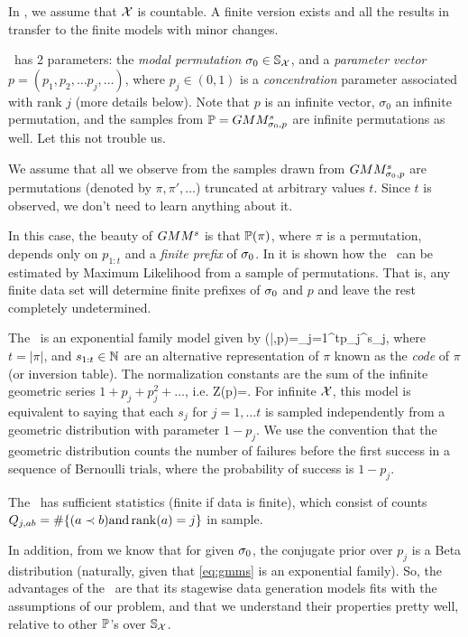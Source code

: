 \documentclass[10pt]{article}
\begin{document}
\benum
\item In \gmms, we assume that ${\mathcal X}$ is countable. A finite version exists and all the results in \cite{MBao} transfer to the finite models with minor changes.
\item \gmms~has 2 parameters: the {\em modal permutation} $\sigma_0\in
  {\mathbb S}_{{\mathcal X}}$, and a {\em parameter vector} 
  $p=(p_1,p_2,\ldots p_j,\ldots)$, where
  $p_j\in (0,1)$ is a {\em concentration} parameter associated
  with rank $j$ (more details below). Note that $p$ is an
  infinite vector, $\sigma_0$ an infinite permutation, and the samples
  from ${\mathbb P}=GMM^s_{\sigma_0,p}$ are infinite permutations as
  well. Let this not trouble us.
\item We assume that all we observe from the samples drawn from $GMM^s_{\sigma_0,p}$ are \topt permutations (denoted by $\pi,\pi',\ldots$) truncated at arbitrary values $t$. Since $t$ is observed, we don't need to learn anything about it.
\item
  In this case, the beauty of $GMM^s$ is that ${\mathbb P}(\pi)$, where $\pi$ is a \topt permutation, depends only on $p_{1:t}$ and a {\em finite prefix} of $\sigma_0$. In \cite{MBao} it is shown how the \gmms~can be estimated by Maximum Likelihood from a sample of \topt permutations. That is, any finite data set will determine finite prefixes of $\sigma_0$ and $p$ and leave the rest completely undetermined.
\item The \gmms~is an exponential family model given by
  \beq
  \label{eq:gmms}
\gmms(\pi|\sigzero,p)\;=\;\prod_{j=1}^tp_j^{s_j},
\eeq
%
where $t=|\pi|$, and $s_{1:t}\in{\mathbb N}$ are an alternative representation of $\pi$ known as the {\em code} of $\pi$ \cite{Stanley} (or inversion table). The normalization constants are the sum of the infinite geometric series $1+p_j+p_j^2+\ldots$, i.e.
\beq
Z(p)\;=\;.
\eeq
For infinite ${\mathcal X}$, this model is equivalent to saying that each $s_j$ for $j=1 ,\ldots t$ is sampled independently from a geometric distribution with parameter $1-p_j$. We use the convention that the geometric distribution counts the number of failures before the first success in a sequence of Bernoulli trials, where the probability of success is $1-p_j$.
\item The \gmms~has sufficient statistics (finite if data is finite), which consist of counts $Q_{j,ab}=\#\{(a\prec b) \text{and} \operatorname{rank}(a)=j\}$ in sample.
\item In addition, from \cite{MBao} we know that for given $\sigma_0$, the conjugate prior over $p_j$ is a Beta distribution (naturally, given that \eqref{eq:gmms} is an exponential family). 
\eenum
So, the advantages of the \gmms~are that its stagewise data generation models fits with the assumptions of our problem, and that we understand their properties pretty well, relative to other ${\mathbb P}$'s over ${\mathbb S}_{{\mathcal X}}$.
\end{document}
